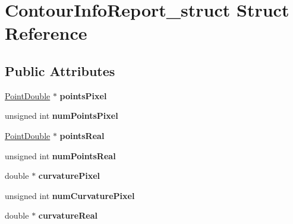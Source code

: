 \hypertarget{structContourInfoReport__struct}{
\section{ContourInfoReport\_\-struct Struct Reference}
\label{structContourInfoReport__struct}
}
\subsection*{Public Attributes}
\begin{DoxyCompactItemize}
\item 
\hypertarget{structContourInfoReport__struct_ab323328a35f851a14a94f4864e0ef5fc}{
\hyperlink{structPointDouble__struct}{PointDouble} $\ast$ {\bfseries pointsPixel}}
\label{structContourInfoReport__struct_ab323328a35f851a14a94f4864e0ef5fc}

\item 
\hypertarget{structContourInfoReport__struct_a6ab9461781ffce43f49e1f7b9a522d21}{
unsigned int {\bfseries numPointsPixel}}
\label{structContourInfoReport__struct_a6ab9461781ffce43f49e1f7b9a522d21}

\item 
\hypertarget{structContourInfoReport__struct_a7cdd99a3bb108d1df40dcefe6a26cca6}{
\hyperlink{structPointDouble__struct}{PointDouble} $\ast$ {\bfseries pointsReal}}
\label{structContourInfoReport__struct_a7cdd99a3bb108d1df40dcefe6a26cca6}

\item 
\hypertarget{structContourInfoReport__struct_a00b5e0b36ab6a3708cab78ba1568c478}{
unsigned int {\bfseries numPointsReal}}
\label{structContourInfoReport__struct_a00b5e0b36ab6a3708cab78ba1568c478}

\item 
\hypertarget{structContourInfoReport__struct_acc397e6a930283ee6e1b4cc000fd14af}{
double $\ast$ {\bfseries curvaturePixel}}
\label{structContourInfoReport__struct_acc397e6a930283ee6e1b4cc000fd14af}

\item 
\hypertarget{structContourInfoReport__struct_a7b7e8dfa5b457622d894824645869b23}{
unsigned int {\bfseries numCurvaturePixel}}
\label{structContourInfoReport__struct_a7b7e8dfa5b457622d894824645869b23}

\item 
\hypertarget{structContourInfoReport__struct_a141965ed1ba8bda966fae5d1e643dda2}{
double $\ast$ {\bfseries curvatureReal}}
\label{structContourInfoReport__struct_a141965ed1ba8bda966fae5d1e643dda2}


\end{DoxyCompactItemize}
